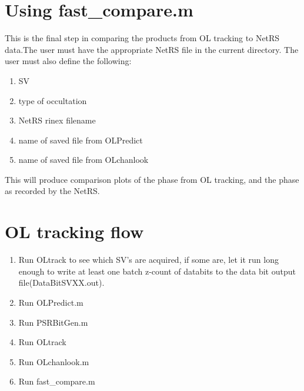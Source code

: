 \documentclass[12pt,letterpaper,oneside]{report}
\begin{document}
\section{Using fast\_compare.m}
This is the final step in comparing the products from OL tracking to NetRS data.The user must have the appropriate NetRS file in the current directory. The user must also define the following:
\begin{enumerate}
\item SV
\item type of occultation
\item NetRS rinex filename
\item name of saved file from OLPredict 
\item name of saved file from OLchanlook
\end{enumerate}
This will produce comparison plots of the phase from OL tracking, and the phase as recorded by the NetRS.

\section{OL tracking flow}
\begin{enumerate}
\item Run OLtrack to see which SV's are acquired, if some are, let it run long enough to write at least one batch z-count of databits to the data bit output file(DataBitSVXX.out).
\item Run OLPredict.m
\item Run PSRBitGen.m
\item Run OLtrack
\item Run OLchanlook.m
\item Run fast\_compare.m
\end{enumerate}

\newpage
\end{document}
